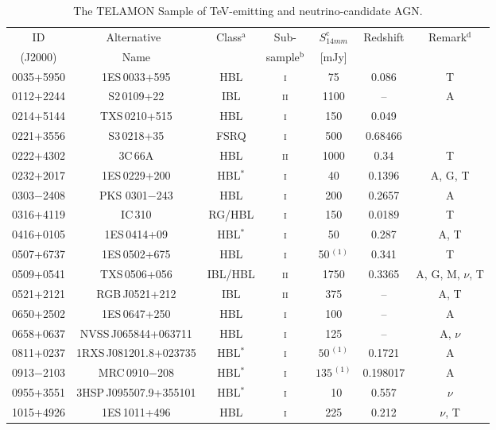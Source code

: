 \documentclass[a4paper,11pt]{article}
\begin{document}
\footnotesize
\begin{table}[hbt]
\caption{\small The TELAMON Sample of TeV-emitting and neutrino-candidate AGN. }
\centering
\footnotesize
\begin{tabular}{@{}cccccc@{\,\,}c@{\,}}
\hline\hline
ID  & Alternative\ & Class$^\textrm{a}$ & Sub- & $S_{14mm}^\textrm{c}$ &  Redshift & Remark$^\textrm{d}$ \\
  (J2000)   &    Name        &        & sample$^\textrm{b}$ & [mJy] & \\
\hline
0035+5950 & 1ES\,0033+595 & HBL & \textsc{i} & 75 & 0.086 & T \\
0112+2244 & S2\,0109+22 & IBL & \textsc{ii} & 1100 & -- & A \\
0214+5144 & TXS\,0210+515 & HBL & \textsc{i} & 150 & 0.049 & \\
0221+3556 & S3\,0218+35 & FSRQ & \textsc{i} & 500 & 0.68466 & \\
0222+4302 & 3C\,66A & HBL & \textsc{ii} & 1000 & 0.34 & T\\
0232+2017 & 1ES\,0229+200 & HBL$^*$ & \textsc{i} & 40 & 0.1396 & A, G, T\\
0303$-$2408 & PKS 0301$-$243 & HBL & \textsc{i} & 200 & 0.2657 & A \\
0316+4119 & IC\,310 & RG/HBL & \textsc{i} & 150 & 0.0189  & T\\
0416+0105 & 1ES\,0414+09 & HBL$^*$ & \textsc{i} & 50 & 0.287 & A, T \\
0507+6737 & 1ES\,0502+675 & HBL & \textsc{i} & 50$^{\,(1)}$ & 0.341 & T \\
0509+0541 & TXS\,0506+056 & IBL/HBL & \textsc{ii} & 1750 & 0.3365 & A, G, M, $\nu$, T\\
0521+2121 & RGB\,J0521+212 & IBL & \textsc{ii} & 375 & -- & A, T\\
0650+2502  & 1ES\,0647+250 & HBL & \textsc{i} & 100 & -- & A \\
0658+0637 & NVSS\,J065844+063711 & HBL & \textsc{i} & 125 & -- & A, $\nu$ \\
0811+0237 & 1RXS\,J081201.8+023735 & HBL$^*$ & \textsc{i} & $50^{\,(1)}$ & 0.1721  & A\\
0913$-$2103 & MRC\,0910$-$208 & HBL$^*$ & \textsc{i} & $135^{\,(1)}$ & 0.198017  & A\\
0955+3551 & 3HSP\,J095507.9+355101 & HBL$^*$ & \textsc{i} & ~10 & 0.557 & $\nu$\\
1015+4926 & 1ES\,1011+496 & HBL & \textsc{i} & 225 & 0.212 & $\nu$, T\\

\end{tabular}
\end{table}
\end{document}

